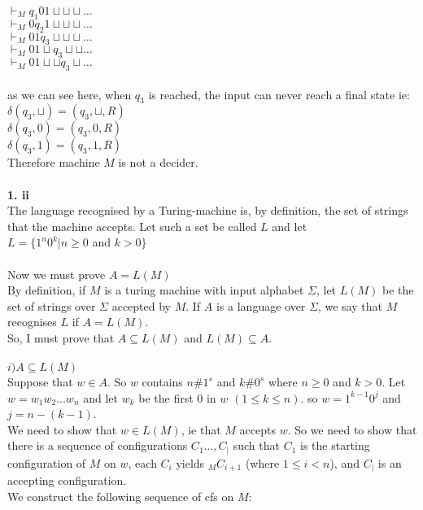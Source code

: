 \documentclass[a4paper,12pt]{article}
\begin{document}
$\vdash_M q_1 0 1 \sqcup \sqcup \sqcup \dots$ \\
$\vdash_M 0 q_2 1 \sqcup \sqcup \sqcup \dots$ \\
$\vdash_M 0 1 q_3 \sqcup \sqcup \sqcup \dots$ \\
$\vdash_M 0 1 \sqcup q_3 \sqcup \sqcup \dots$ \\
$\vdash_M 0 1 \sqcup \sqcup q_3 \sqcup \dots$ \\
\\
as we can see here, when $q_3$ is reached, the input can never reach a final state ie: \\
$\delta ( q_3 , \sqcup ) = ( q_3 , \sqcup , R )$ \\
$\delta ( q_3 , 0 ) = ( q_3 , 0 , R )$ \\
$\delta ( q_3 , 1 ) = ( q_3 , 1 , R )$ \\
Therefore machine $M$ is not a decider. \\
\\
\textbf{1. ii} \\
The language recognised by a Turing-machine is, by definition, the set of strings that the machine accepts. Let such a set be called $L$ and let \\
$L=\{1^n 0^k | n \geq 0$ and $k > 0\}$ \\
\\
Now we must prove $A=L(M)$ \\
By definition, if $M$ is a turing machine with input alphabet $\Sigma$, let $L(M)$ be the set of strings over $\Sigma$ accepted by $M$. If $A$ is a language over $\Sigma$, we say that $M$ recognises $L$ if $A=L(M)$. \\
So, I must prove that $A \subseteq L(M)$ and $L(M) \subseteq A$. \\
\\
$i) A \subseteq L(M)$ \\
Suppose that $w \in A$. So $w$ contains $n\#1^s$ and $k\#0^s$ where $n \geq 0$ and $k > 0$. Let $w = w_1 w_2 \dots w_n$ and let $w_k$ be the first $0$ in $w$ $(1 \leq  k \leq n)$.
so $w = 1^{k-1}0^{j}$ and $j = n - ( k - 1)$. \\ 
We need to show that $w \in L(M)$, ie that $M$ accepts $w$. So we need to show that there is a sequence of configurations $C_1 \dots, C_|$ such that $C_1$ is the starting configuration of $M$ on $w$, each $C_i$ yields $_M C_{i+1}$ (where $1 \leq i < n $), and $C_|$ is an accepting configuration. \\
We construct the following sequence of cfs on $M$: \\
\end{document}
